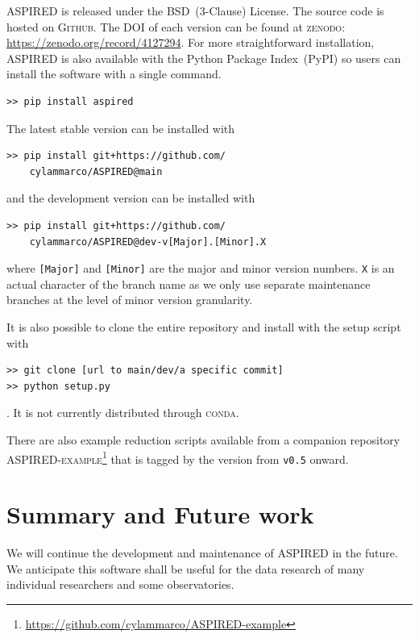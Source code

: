 \documentclass[linenumbers, twocolumn]{aastex631}
\begin{document}
\textsc{ASPIRED} is released under the BSD~(3-Clause) License. The source code
is hosted on \textsc{Github}. The DOI of each version can be found at 
\textsc{zenodo}: \url{https://zenodo.org/record/4127294}. For more
straightforward installation, \textsc{ASPIRED} is also available with the
Python Package Index~(PyPI) so users can install the software with a single command. 
\begin{verbatim}
>> pip install aspired
\end{verbatim}
The latest stable version can be installed with
\begin{verbatim}
>> pip install git+https://github.com/
    cylammarco/ASPIRED@main
\end{verbatim}
and the development version can be installed with 
\begin{verbatim}
>> pip install git+https://github.com/
    cylammarco/ASPIRED@dev-v[Major].[Minor].X
\end{verbatim} where \verb+[Major]+ and \verb+[Minor]+ are the major and minor
version numbers. \verb+X+ is an actual character of the branch name as we only
use separate maintenance branches at the level of minor version granularity.

It is also possible to clone the entire repository
and install with the setup script with
\begin{verbatim}
>> git clone [url to main/dev/a specific commit]
>> python setup.py
\end{verbatim}
. It is not currently distributed through \textsc{conda}.

There are also example reduction scripts available from a companion repository
\textsc{ASPIRED-example}\footnote{\url{https://github.com/cylammarco/ASPIRED-example}}
that is tagged by the version from \texttt{v0.5} onward.

\section{Summary and Future work}
\label{sec:summary}

We will continue the development and maintenance of \textsc{ASPIRED} in the
future. We anticipate this software shall be useful for the data research of
many individual researchers and some observatories.
\end{document}
